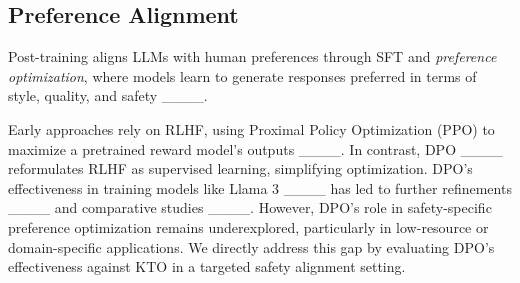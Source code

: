 \subsection{Preference Alignment}
\label{sec:pref_align}
Post-training aligns LLMs with human preferences through SFT and \textit{preference optimization}, where models learn to generate responses preferred in terms of style, quality, and safety ____.

Early approaches rely on RLHF, using Proximal Policy Optimization (PPO) to maximize a pretrained reward model’s outputs ____. In contrast, DPO ____ reformulates RLHF as supervised learning, simplifying optimization. DPO’s effectiveness in training models like Llama 3 ____ has led to further refinements ____ and comparative studies ____. However, DPO's role in safety-specific preference optimization remains underexplored, particularly in low-resource or domain-specific applications. We directly address this gap by evaluating DPO’s effectiveness against KTO in a targeted safety alignment setting.
